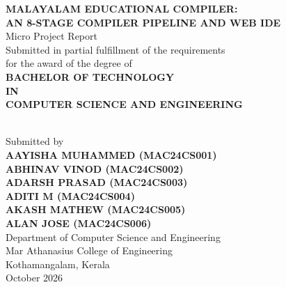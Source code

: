 \documentclass[12pt,a4paper]{report}
\begin{document}
\begin{titlepage}
    \centering
    \vspace*{0.5cm}
    
    {\Large \textbf{MALAYALAM EDUCATIONAL COMPILER:}}\\[0.3cm]
    {\large \textbf{AN 8-STAGE COMPILER PIPELINE AND WEB IDE}}\\[1.2cm]
    
    {\large Micro Project Report}\\[0.6cm]
    
    {\small Submitted in partial fulfillment of the requirements\\
    for the award of the degree of}\\[0.6cm]
    
    {\large \textbf{BACHELOR OF TECHNOLOGY}}\\[0.2cm]
    {\large \textbf{IN}}\\[0.2cm]
    {\large \textbf{COMPUTER SCIENCE AND ENGINEERING}}\\[1.0cm]
    
    \\[1.0cm]
    
    {\small Submitted by}\\[0.4cm]
    
    \textbf{AAYISHA MUHAMMED (MAC24CS001)}\\
    \textbf{ABHINAV VINOD (MAC24CS002)}\\
    \textbf{ADARSH PRASAD (MAC24CS003)}\\
    \textbf{ADITI M (MAC24CS004)}\\
    \textbf{AKASH MATHEW (MAC24CS005)}\\
    \textbf{ALAN JOSE (MAC24CS006)}\\[1.2cm]
    
    {\small Department of Computer Science and Engineering\\
    Mar Athanasius College of Engineering\\
    Kothamangalam, Kerala}\\[0.6cm]
    
    {\small October 2026}
\end{titlepage}
\end{document}
